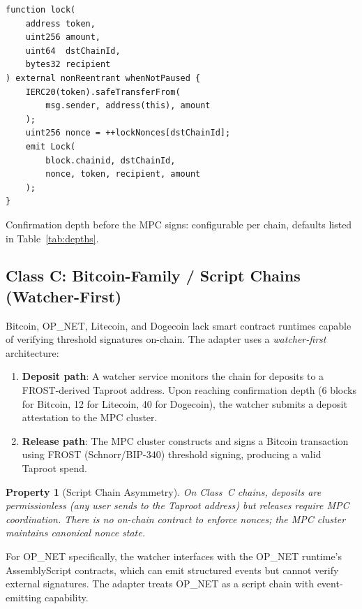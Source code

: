 \documentclass[11pt]{article}
\newtheorem{property}{Property}
\begin{document}
\begin{lstlisting}[language=Solidity,caption={TeleportVault lock function (simplified)}]
function lock(
    address token,
    uint256 amount,
    uint64  dstChainId,
    bytes32 recipient
) external nonReentrant whenNotPaused {
    IERC20(token).safeTransferFrom(
        msg.sender, address(this), amount
    );
    uint256 nonce = ++lockNonces[dstChainId];
    emit Lock(
        block.chainid, dstChainId,
        nonce, token, recipient, amount
    );
}
\end{lstlisting}

Confirmation depth before the MPC signs: configurable per chain, defaults listed in Table~\ref{tab:depths}.

\subsection{Class C: Bitcoin-Family / Script Chains (Watcher-First)}
\label{sec:class-c}

Bitcoin, OP\_NET, Litecoin, and Dogecoin lack smart contract runtimes capable of verifying threshold signatures on-chain. The adapter uses a \emph{watcher-first} architecture:

\begin{enumerate}[nosep]
  \item \textbf{Deposit path}: A watcher service monitors the chain for deposits to a FROST-derived Taproot address. Upon reaching confirmation depth (6 blocks for Bitcoin, 12 for Litecoin, 40 for Dogecoin), the watcher submits a deposit attestation to the MPC cluster.
  \item \textbf{Release path}: The MPC cluster constructs and signs a Bitcoin transaction using FROST (Schnorr/BIP-340) threshold signing, producing a valid Taproot spend.
\end{enumerate}


\begin{property}[Script Chain Asymmetry]
On Class~C chains, deposits are permissionless (any user sends to the Taproot address) but releases require MPC coordination. There is no on-chain contract to enforce nonces; the MPC cluster maintains canonical nonce state.
\end{property}

For OP\_NET specifically, the watcher interfaces with the OP\_NET runtime's AssemblyScript contracts, which can emit structured events but cannot verify external signatures. The adapter treats OP\_NET as a script chain with event-emitting capability.
\end{document}
